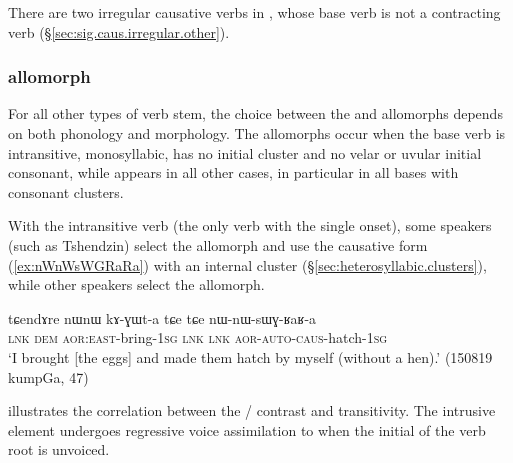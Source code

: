 There are two irregular causative verbs in , whose base verb is not a contracting verb (§\ref{sec:sig.caus.irregular.other}).

\subsubsection{ allomorph} \label{sec:caus.sWG}
For all other types of verb stem, the choice between the  and  allomorphs depends on both phonology and morphology. The  allomorphs occur when the base verb is intransitive, monosyllabic, has no initial cluster and no velar or uvular initial consonant, while  appears in all other cases, in particular in all bases with consonant clusters. 

With the intransitive verb  (the only verb with the single  onset), some speakers (such as Tshendzin) select the  allomorph and use the causative form   (\ref{ex:nWnWsWGRaRa}) with an internal  cluster (§\ref{sec:heterosyllabic.clusters}), while other speakers select the  allomorph.

\begin{exe}
\ex \label{ex:nWnWsWGRaRa}
\gll tɕendɤre nɯnɯ kɤ-ɣɯt-a tɕe tɕe nɯ-nɯ-sɯɣ-ʁaʁ-a    \\
\textsc{lnk} \textsc{dem} \textsc{aor}:\textsc{east}-bring-\textsc{1sg} \textsc{lnk} \textsc{lnk} \textsc{aor}-\textsc{auto}-\textsc{caus}-hatch-\textsc{1sg}   \\
\glt `I brought [the eggs] and made them hatch by myself (without a hen).' (150819 kumpGa, 47)
\end{exe}

 illustrates the correlation between the  /  contrast and transitivity. The intrusive  element undergoes regressive voice assimilation to  when the initial of the verb root is unvoiced.   
 

